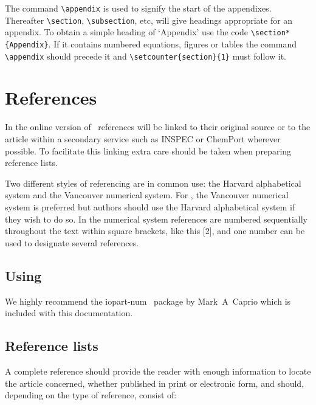 \documentclass[a4paper]{jpconf}
\begin{document}
The command \verb"\appendix" is used to signify the start of the
appendixes. Thereafter \verb"\section", \verb"\subsection", etc, will 
give headings appropriate for an appendix. To obtain a simple heading of 
`Appendix' use the code \verb"\section*{Appendix}". If it contains
numbered equations, figures or tables the command \verb"\appendix" should
precede it and \verb"\setcounter{section}{1}" must follow it. 

\section{References}
In the online version of \jpcs\ references will be linked to their original source or to the article within a secondary service such as INSPEC or ChemPort wherever possible. To facilitate this linking extra care should be taken when preparing reference lists. 

Two different styles of referencing are in common use: the Harvard alphabetical system and the Vancouver numerical system.  For \jpcs, the Vancouver numerical system is preferred but authors should use the Harvard alphabetical system if they wish to do so. In the numerical system references are numbered sequentially throughout the text within square brackets, like this [2], and one number can be used to designate several references.  

\subsection{Using \BibTeX}
We highly recommend the {\ttfamily\textbf\selectfont iopart-num} \BibTeX\ package by Mark~A~Caprio 
which is included with this documentation.

\subsection{Reference lists}
A complete reference should provide the reader with enough information to locate the article concerned, whether published in print or electronic form, and should, depending on the type of reference, consist of:  
\end{document}
